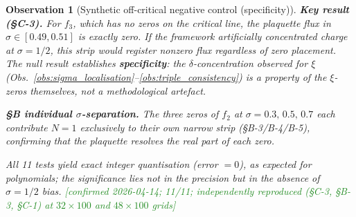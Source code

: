 \documentclass[11pt, a4paper]{article}
\theoremstyle{definition}
\theoremstyle{plain}
\newtheorem{observation}[theorem]{Observation}
\newcommand{\xif}{\xi}                      %
\begin{document}
\begin{observation}[Synthetic off-critical negative control (specificity)]
\noindent
\textbf{Key result (\S C-3).}\;
For $f_3$, which has \emph{no} zeros on the critical line,
the plaquette flux in $\sigma\in[0.49,0.51]$ is exactly zero.
If the framework artificially concentrated charge at $\sigma=1/2$,
this strip would register nonzero flux regardless of zero placement.
The null result establishes \textbf{specificity}: the $\delta$-concentration
observed for $\xif$ (Obs.~\ref{obs:sigma_localisation}--\ref{obs:triple_consistency})
is a property of the $\xif$-zeros themselves, not a methodological artefact.

\smallskip\noindent
\textbf{\S B individual $\sigma$-separation.}\;
The three zeros of $f_2$ at $\sigma=0.3,\,0.5,\,0.7$ each contribute
$N=1$ exclusively to their own narrow strip (\S B-3/B-4/B-5),
confirming that the plaquette resolves the real part of each zero.

\smallskip\noindent
All 11 tests yield exact integer quantisation (error $=0$),
as expected for polynomials; the significance lies not in the
precision but in the \emph{absence of $\sigma=1/2$ bias}.
\textcolor{ForestGreen}{[confirmed 2026-04-14; 11/11;
independently reproduced (\S C-3, \S B-3, \S C-1)
at $32\!\times\!100$ and $48\!\times\!100$ grids]}
\end{observation}
\end{document}
